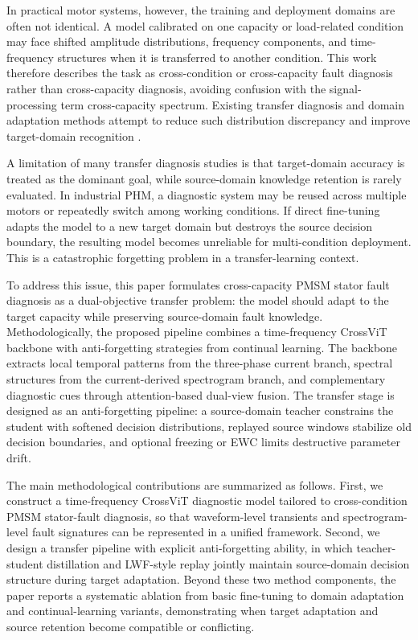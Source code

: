 \documentclass[conference,letterpaper]{IEEEtran}\IEEEoverridecommandlockouts
\begin{document}
In practical motor systems, however, the training and deployment domains are often not identical. A model calibrated on one capacity or load-related condition may face shifted amplitude distributions, frequency components, and time-frequency structures when it is transferred to another condition. This work therefore describes the task as cross-condition or cross-capacity fault diagnosis rather than cross-capacity diagnosis, avoiding confusion with the signal-processing term cross-capacity spectrum. Existing transfer diagnosis and domain adaptation methods attempt to reduce such distribution discrepancy and improve target-domain recognition \cite{cao2021dscnn,yang2018can,du2019hybrid,xing2023dsfan,guan2025ucmg}.

A limitation of many transfer diagnosis studies is that target-domain accuracy is treated as the dominant goal, while source-domain knowledge retention is rarely evaluated. In industrial PHM, a diagnostic system may be reused across multiple motors or repeatedly switch among working conditions. If direct fine-tuning adapts the model to a new target domain but destroys the source decision boundary, the resulting model becomes unreliable for multi-condition deployment. This is a catastrophic forgetting problem in a transfer-learning context.

To address this issue, this paper formulates cross-capacity PMSM stator fault diagnosis as a dual-objective transfer problem: the model should adapt to the target capacity while preserving source-domain fault knowledge. Methodologically, the proposed pipeline combines a time-frequency CrossViT backbone with anti-forgetting strategies from continual learning. The backbone extracts local temporal patterns from the three-phase current branch, spectral structures from the current-derived spectrogram branch, and complementary diagnostic cues through attention-based dual-view fusion. The transfer stage is designed as an anti-forgetting pipeline: a source-domain teacher constrains the student with softened decision distributions, replayed source windows stabilize old decision boundaries, and optional freezing or EWC limits destructive parameter drift.

The main methodological contributions are summarized as follows. First, we construct a time-frequency CrossViT diagnostic model tailored to cross-condition PMSM stator-fault diagnosis, so that waveform-level transients and spectrogram-level fault signatures can be represented in a unified framework. Second, we design a transfer pipeline with explicit anti-forgetting ability, in which teacher-student distillation and LWF-style replay jointly maintain source-domain decision structure during target adaptation. Beyond these two method components, the paper reports a systematic ablation from basic fine-tuning to domain adaptation and continual-learning variants, demonstrating when target adaptation and source retention become compatible or conflicting.
\end{document}
